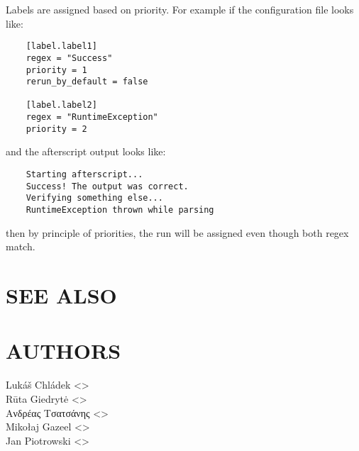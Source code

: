 \documentclass[a4paper,english]{article}
\begin{document}
\begin{adjustwidth}{18pt}{0pt}
  Labels are assigned based on priority.
  For example if the configuration file looks like:
  \begin{verbatim}
    [label.label1]
    regex = "Success"
    priority = 1
    rerun_by_default = false

    [label.label2]
    regex = "RuntimeException"
    priority = 2
  \end{verbatim}

  and the afterscript output looks like:

  \begin{verbatim}
    Starting afterscript...
    Success! The output was correct.
    Verifying something else...
    RuntimeException thrown while parsing
  \end{verbatim}

  then by principle of priorities, the run will be assigned  even though both regex match.


  \section{SEE ALSO}

  \section{AUTHORS}
    Lukáš Chládek <>\\[0.1cm]\MANbr
    Rūta Giedrytė <>\\[0.1cm]\MANbr
    Ανδρέας Τσατσάνης <>\\[0.1cm]\MANbr
    Mikołaj Gazeel <>\\[0.1cm]\MANbr
    Jan Piotrowski <>
\end{adjustwidth}
\end{document}
